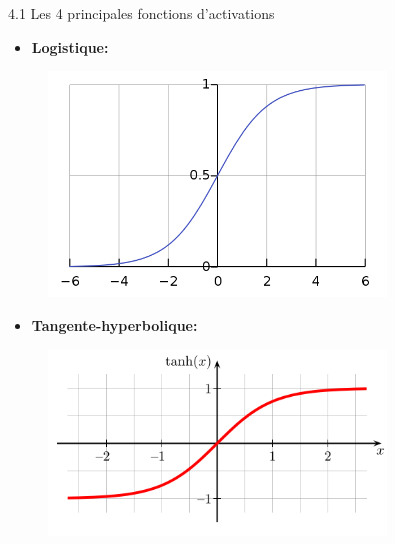 \begin{frame}{4.1 Les 4 principales fonctions d'activations}
  \begin{minipage}{0.48\textwidth}
    \begin{itemize}
    \item \textbf{Logistique:}
    \end{itemize}
    \vspace{-0.5cm}
    \begin{figure}
      \includegraphics[width=0.8\textwidth,height=0.3\textheight]{fig/logisticFct.png}
    \end{figure}
  \end{minipage}
  \begin{minipage}{0.48\textwidth}
    \begin{itemize}
    \item \textbf{Tangente-hyperbolique:}
    \end{itemize}
    \vspace{-0.5cm}
    \begin{figure}
      \includegraphics[width=0.8\textwidth,height=0.3\textheight]{fig/tanhFct.png}
    \end{figure}
  \end{minipage}
  \vfill
  \begin{minipage}{0.48\textwidth}

\end{minipage}
\end{frame}
